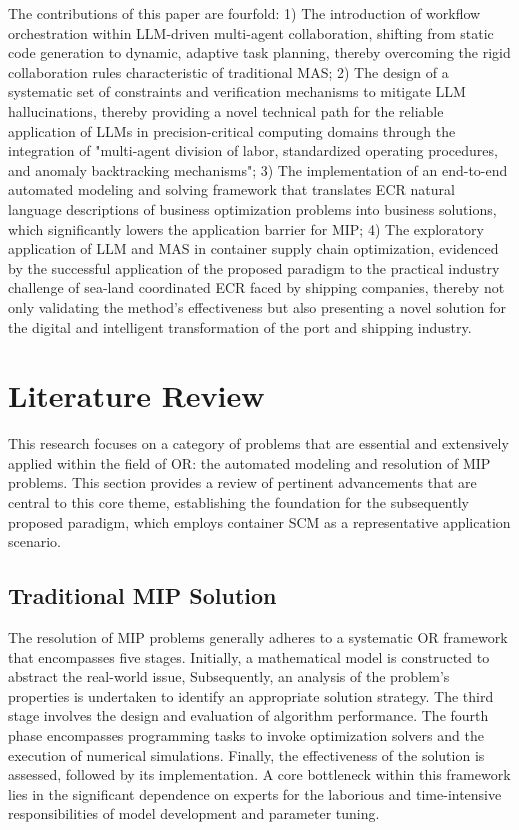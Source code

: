 \documentclass[preprint,12pt]{elsarticle}
\begin{document}
The contributions of this paper are fourfold: 1) The introduction of workflow orchestration within LLM-driven multi-agent collaboration, shifting from static code generation to dynamic, adaptive task planning, thereby overcoming the rigid collaboration rules characteristic of traditional MAS; 2) The design of a systematic set of constraints and verification mechanisms to mitigate LLM hallucinations, thereby providing a novel technical path for the reliable application of LLMs in precision-critical computing domains through the integration of "multi-agent division of labor, standardized operating procedures, and anomaly backtracking mechanisms"; 3) The implementation of an end-to-end automated modeling and solving framework that translates ECR natural language descriptions of business optimization problems into business solutions, which significantly lowers the application barrier for MIP; 4) The exploratory application of LLM and MAS in container supply chain optimization, evidenced by the successful application of the proposed paradigm to the practical industry challenge of sea-land coordinated ECR faced by shipping companies, thereby not only validating the method's effectiveness but also presenting a novel solution for the digital and intelligent transformation of the port and shipping industry.


\section{Literature Review}
This research focuses on a category of problems that are essential and extensively applied within the field of OR: the automated modeling and resolution of MIP problems. This section provides a review of pertinent advancements that are central to this core theme, establishing the foundation for the subsequently proposed paradigm, which employs container SCM as a representative application scenario.

\subsection{Traditional MIP Solution}
The resolution of MIP problems generally adheres to a systematic OR framework that encompasses five stages. Initially, a mathematical model is constructed to abstract the real-world issue, Subsequently, an analysis of the problem's properties is undertaken to identify an appropriate solution strategy. The third stage involves the design and evaluation of algorithm performance. The fourth phase encompasses programming tasks to invoke optimization solvers and the execution of numerical simulations. Finally, the effectiveness of the solution is assessed, followed by its implementation. A core bottleneck within this framework lies in the significant dependence on experts for the laborious and time-intensive responsibilities of model development and parameter tuning.
\end{document}
